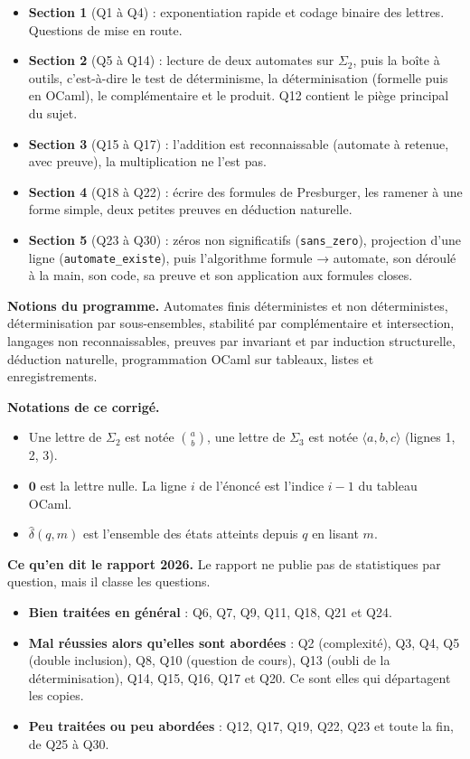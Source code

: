 \documentclass[11pt,a4paper]{article}
\providecommand{\tightlist}{\setlength{\itemsep}{0pt}\setlength{\parskip}{0pt}}
\begin{document}
\begin{itemize}
\tightlist
\item
  \textbf{Section 1} (Q1 à Q4) : exponentiation rapide et codage binaire des lettres. Questions de mise en route.
\item
  \textbf{Section 2} (Q5 à Q14) : lecture de deux automates sur \(\Sigma_2\), puis la boîte à outils, c'est-à-dire le test de déterminisme, la déterminisation (formelle puis en OCaml), le complémentaire et le produit. Q12 contient le piège principal du sujet.
\item
  \textbf{Section 3} (Q15 à Q17) : l'addition est reconnaissable (automate à retenue, avec preuve), la multiplication ne l'est pas.
\item
  \textbf{Section 4} (Q18 à Q22) : écrire des formules de Presburger, les ramener à une forme simple, deux petites preuves en déduction naturelle.
\item
  \textbf{Section 5} (Q23 à Q30) : zéros non significatifs (\texttt{sans\_zero}), projection d'une ligne (\texttt{automate\_existe}), puis l'algorithme formule → automate, son déroulé à la main, son code, sa preuve et son application aux formules closes.
\end{itemize}

\textbf{Notions du programme.} Automates finis déterministes et non déterministes, déterminisation par sous-ensembles, stabilité par complémentaire et intersection, langages non reconnaissables, preuves par invariant et par induction structurelle, déduction naturelle, programmation OCaml sur tableaux, listes et enregistrements.

\textbf{Notations de ce corrigé.}

\begin{itemize}
\tightlist
\item
  Une lettre de \(\Sigma_2\) est notée \(\binom ab\), une lettre de \(\Sigma_3\) est notée \(\langle a,b,c\rangle\) (lignes 1, 2, 3).
\item
  \(\mathbf{0}\) est la lettre nulle. La ligne \(i\) de l'énoncé est l'indice \(i-1\) du tableau OCaml.
\item
  \(\widehat{\delta}(q,m)\) est l'ensemble des états atteints depuis \(q\) en lisant \(m\).
\end{itemize}

\textbf{Ce qu'en dit le rapport 2026.} Le rapport ne publie pas de statistiques par question, mais il classe les questions.

\begin{itemize}
\tightlist
\item
  \textbf{Bien traitées en général} : Q6, Q7, Q9, Q11, Q18, Q21 et Q24.
\item
  \textbf{Mal réussies alors qu'elles sont abordées} : Q2 (complexité), Q3, Q4, Q5 (double inclusion), Q8, Q10 (question de cours), Q13 (oubli de la déterminisation), Q14, Q15, Q16, Q17 et Q20. Ce sont elles qui départagent les copies.
\item
  \textbf{Peu traitées ou peu abordées} : Q12, Q17, Q19, Q22, Q23 et toute la fin, de Q25 à Q30.
\end{itemize}
\end{document}
